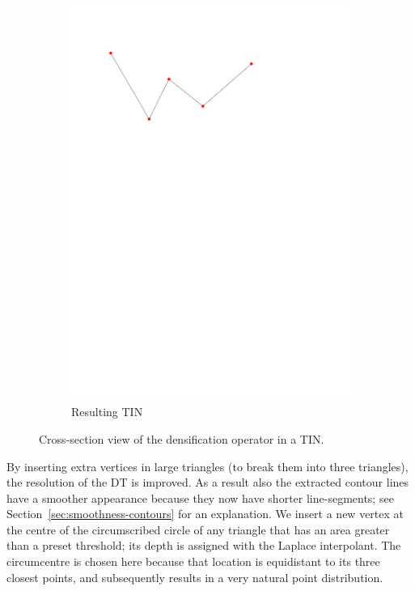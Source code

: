 \begin{figure}
\begin{subfigure}[b]{0.35\linewidth}
    \includegraphics[width=\textwidth,page=4]{figs/1Ddensop.pdf}
    \caption{Resulting TIN}\label{fig:1Ddensop:d}
  \end{subfigure}
  \caption{Cross-section view of the densification operator in a TIN.}
\label{fig:1Ddensop}
\end{figure}

By inserting extra vertices in large triangles (to break them into three triangles), the resolution of the DT is improved.
As a result also the extracted contour lines have a smoother appearance because they now have shorter line-segments; see Section~\ref{sec:smoothness-contours} for an explanation.
We insert a new vertex at the centre of the circumscribed circle of any triangle that has an area greater than a preset threshold; its depth is assigned with the Laplace interpolant.
The circumcentre is chosen here because that location is equidistant to its three closest points, and subsequently results in a very natural point distribution.

